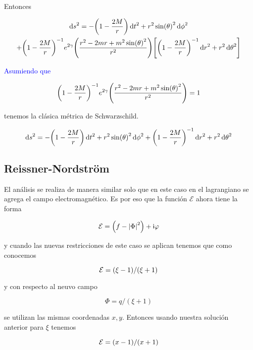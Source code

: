 \documentclass[../Main.tex]{subfiles}
\begin{document}
Entonces

\begin{multline*}
    \dd{s}^{2} = -\qty(1-\dfrac{2M}{r})\dd{t}^{2}+r^{2}\sin(\theta)^{2}\dd{\phi}^{2}\\
    +\qty(1-\dfrac{2M}{r})^{-1}e^{2\gamma}\qty(\dfrac{r^{2}-2mr+m^{2}\sin(\theta)^{2}}{r^{2}})\qty[\qty(1-\dfrac{2M}{r})^{-1}\dd{r}^{2}+r^{2}\dd{\theta}^{2}]
\end{multline*}

\textcolor{blue}{Asumiendo que}

\begin{equation*}
    \qty(1-\dfrac{2M}{r})^{-1}e^{2\gamma}\qty(\dfrac{r^{2}-2mr+m^{2}\sin(\theta)^{2}}{r^{2}})=1
\end{equation*}

tenemos la clásica métrica de Schwarzschild.

\begin{equation}
    \dd{s}^{2} = -\qty(1-\dfrac{2M}{r})\dd{t}^{2}+r^{2}\sin(\theta)^{2}\dd{\phi}^{2}+\qty(1-\dfrac{2M}{r})^{-1}\dd{r}^{2}+r^{2}\dd{\theta}^{2}
\end{equation}

\subsection{Reissner-Nordström}
El análisis se realiza de manera similar solo que en este caso en el lagrangiano se agrega el campo electromagnético. Es por eso que la función $\mathcal{E}$ ahora tiene la forma

\begin{equation}
    \mathcal{E}=\qty(f-\abs{\Phi}^{2})+\mathsf{i}\varphi
\end{equation}

y cuando las nuevas restricciones de este caso se aplican tenemos que como conocemos

\begin{equation}
    \mathcal{E}=\qty(\xi-1)/\qty(\xi+1)
\end{equation}

y con respecto al neuvo campo

\begin{equation}
    \Phi=q/(\xi+1)
\end{equation}

se utilizan las mismas coordenadas $x,y$. Entonces usando nuestra solución anterior para $\xi$ tenemos

\begin{equation}
    \mathcal{E}=\qty(x-1)/\qty(x+1)
\end{equation}
\end{document}
